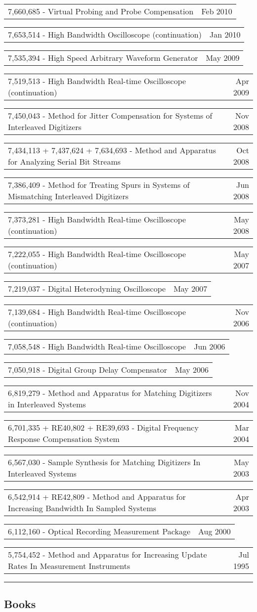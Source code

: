 \documentclass[10pt,letterpaper]{extarticle}
\makeatletter
\newcommand{\headerrow}[2]
{\begin{tabular*}{\linewidth}{l@{\extracolsep{\fill}}r}
	#1 &
	#2 \\
\end{tabular*}}
\makeatother
\begin{document}
	{}\\
\headerrow
		{7,660,685 - Virtual Probing and Probe Compensation}
		{Feb 2010}
\headerrow
		{7,653,514 - High Bandwidth Oscilloscope (continuation)}
		{Jan 2010}		
\headerrow
		{7,535,394 - High Speed Arbitrary Waveform Generator}
		{May 2009}		
\headerrow
		{7,519,513 - High Bandwidth Real-time Oscilloscope (continuation)}
		{Apr 2009}		
\headerrow
		{7,450,043 - Method for Jitter Compensation for Systems of Interleaved Digitizers}
		{Nov 2008}				
\headerrow
		{7,434,113 + 7,437,624 + 7,634,693 - Method and Apparatus for Analyzing Serial Bit Streams}
		{Oct 2008}
\headerrow
		{7,386,409 - Method for Treating Spurs in Systems of Mismatching Interleaved Digitizers}
		{Jun 2008}
\headerrow
		{7,373,281 - High Bandwidth Real-time Oscilloscope (continuation)}
		{May 2008}
\headerrow
		{7,222,055 - High Bandwidth Real-time Oscilloscope (continuation)}
		{May 2007}
\headerrow
		{7,219,037 - Digital Heterodyning Oscilloscope}
		{May 2007}
\headerrow
		{7,139,684 - High Bandwidth Real-time Oscilloscope (continuation)}
		{Nov 2006}
\headerrow
		{7,058,548 - High Bandwidth Real-time Oscilloscope}
		{Jun 2006}
\headerrow
		{7,050,918 - Digital Group Delay Compensator}
		{May 2006}
\headerrow
		{6,819,279 - Method and Apparatus for Matching Digitizers in Interleaved Systems}
		{Nov 2004}
\headerrow
		{6,701,335 + RE40,802 + RE39,693 - Digital Frequency Response Compensation System}
		{Mar 2004}
\headerrow
		{6,567,030 - Sample Synthesis for Matching Digitizers In Interleaved Systems}
		{May 2003}
\headerrow
		{6,542,914 + RE42,809 - Method and Apparatus for Increasing Bandwidth In Sampled Systems}
		{Apr 2003}
\headerrow
		{6,112,160 - Optical Recording Measurement Package}
		{Aug 2000}
\headerrow
		{5,754,452 - Method and Apparatus for Increasing Update Rates In Measurement Instruments}
		{Jul 1995}
\vspace{0.2em}
\hrule
\vspace{-1em}\subsection*{\Large Books}\vspace{-0.5em}
\end{document}
